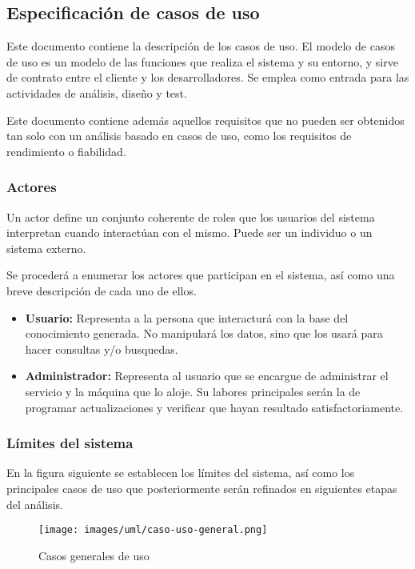 
\subsection{Especificación de casos de uso}\label{sec:espec-casos-uso}

Este documento contiene la descripción de los casos de uso. El modelo 
de casos de uso es un modelo de las funciones que realiza el sistema y 
su entorno, y sirve de contrato entre el cliente y los desarrolladores. 
Se emplea como entrada para las actividades de análisis, diseño y test.

Este documento contiene además aquellos requisitos que no pueden ser 
obtenidos tan solo con un análisis basado en casos de uso, como los 
requisitos de rendimiento o fiabilidad.

\subsubsection{Actores}

Un actor define un conjunto coherente de roles que los usuarios del 
sistema interpretan cuando interactúan con el mismo. Puede ser un 
individuo o un sistema externo.

Se procederá a enumerar los actores que participan en el sistema, 
así como una breve descripción de cada uno de ellos.

\begin{itemize}
  \item \textbf{Usuario:} Representa a la persona que interacturá con 
	la base del conocimiento generada. No manipulará los datos, 
	sino que los usará para hacer consultas y/o busquedas.
  \item \textbf{Administrador:} Representa al usuario que se encargue 
	de administrar el servicio y la máquina que lo aloje. Su labores 
	principales serán la de programar actualizaciones y verificar 
	que hayan resultado satisfactoriamente.
\end{itemize}

\subsubsection{Límites del sistema}

En la figura siguiente se establecen los límites del sistema, así 
como los principales casos de uso que posteriormente serán refinados 
en siguientes etapas del análisis.

\begin{figure}[ht]
 	\centering
	\texttt{[image: images/uml/caso-uso-general.png]}
	\caption{Casos generales de uso}
	\label{fig:uml:casos-uso}
\end{figure}

